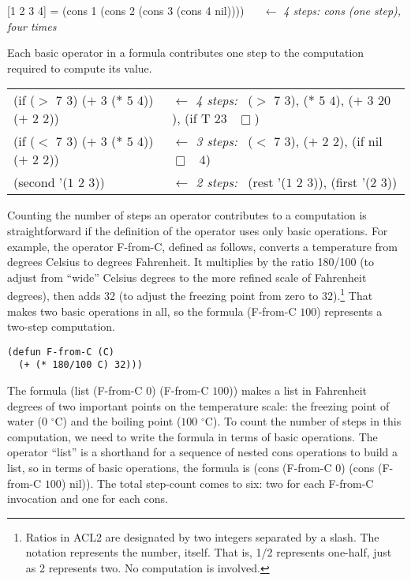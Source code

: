 \begin{center}
[1 2 3 4] = (cons 1 (cons 2 (cons 3 (cons 4 nil)))) ~~ $\leftarrow$ \emph{4 steps: cons (one step), four times}
\end{center}

Each basic operator in a formula contributes one step
to the computation required to compute its value.

\begin{center}
\begin{tabular}{ll}
    (if ($>$ $7$ $3$) ($+$ $3$ ($*$ $5$ $4$)) ($+$ $2$ $2$)) & $\leftarrow$ \emph{4 steps:}~ ($>$ $7$ $3$), ($*$ $5$ $4$), ($+$ $3$ $20$), (if T $23$ ~$\Box$) \\
    (if ($<$ $7$ $3$) ($+$ $3$ ($*$ $5$ $4$)) ($+$ $2$ $2$)) & $\leftarrow$ \emph{3 steps:}~ ($<$ $7$ $3$), ($+$ $2$ $2$), (if nil ~$\Box$~ $4$) \\
    (second '($1$ $2$ $3$))                                  & $\leftarrow$ \emph{2 steps:}~ (rest '($1$ $2$ $3$)), (first '($2$ $3$))
\end{tabular}
\end{center}

Counting the number of steps an operator
contributes to a computation is straightforward
if the definition of the operator uses only basic operations.
For example, the operator F-from-C, defined
as follows, converts a temperature from degrees Celsius to
degrees Fahrenheit. It multiplies by the ratio 180/100
(to adjust from ``wide'' Celsius degrees to the
more refined scale of Fahrenheit degrees), then adds 32
(to adjust the freezing point from zero to 32).\footnote{Ratios
in ACL2 are designated
by two integers separated by a slash.
The notation represents the number, itself.
That is, 1/2 represents one-half, just as 2 represents two.
No computation is involved.}
That makes two basic operations in all, so the formula
(F-from-C $100$) represents a two-step computation.

\begin{Verbatim}
(defun F-from-C (C)
  (+ (* 180/100 C) 32)))
\end{Verbatim}

The formula (list (F-from-C $0$) (F-from-C $100$))
makes a list in Fahrenheit degrees of two important
points on the temperature scale:
the freezing point of water ($0$ $^\circ$C) and the boiling point ($100$ $^\circ$C).
To count the number of steps in this computation,
we need to write the formula in terms of basic operations.
The operator ``list'' is a shorthand for a sequence of nested
cons operations to build a list,
so in terms of basic operations, the formula is
(cons (F-from-C $0$) (cons (F-from-C $100$) nil)).
The total step-count comes to six: two for each F-from-C invocation
and one for each cons.

